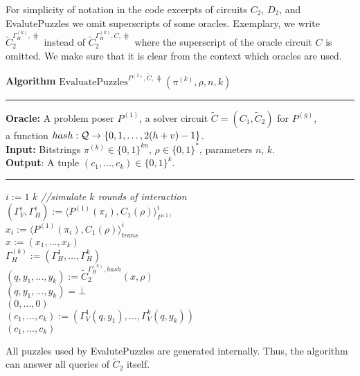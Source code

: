 For simplicity of notation in the code excerpts of circuits $C_2$, $D_2$, and EvalutePuzzles we
omit superscripts of some oracles. Exemplary, we write $\widetilde{C}_2^{\Gamma_H^{(k)}, \hash}$ instead of $\widetilde{C}_2^{\Gamma_H^{(k)}, C, \hash}$ where
the superscript of the oracle circuit $C$ is omitted. We make sure that it is clear from the context which oracles are used.

\begin{codeblock}
  \textbf{Algorithm} $\text{EvaluatePuzzles}^{P^{(1)}, \widetilde{C}, \hash}(\pi^{(k)}, \rho, n, k)$
  \medskip \hrule
  \textbf{Oracle:}  A problem poser $P^{(1)}$, a solver circuit $\widetilde{C} = (C_1, \widetilde{C}_2)$ for $P^{(g)}$,\\
  \IndII a function $hash : \mathcal{Q} \rightarrow \{0,1,\dots, 2(h+v)-1\}$.\\
  \textbf{Input:} Bitstrings $\pi^{(k)} \in \{0,1\}^{kn}$, $\rho \in \{0,1\}^{*}$, parameters $n$, $k$.\\
  \textbf{Output}: A tuple $(c_1, \dots, c_k) \in \{0,1\}^{k}$.
  \medskip\hrule
  \For $i:=1$ \To $k$ \Do \IndII \textit{//simulate $k$ rounds of interaction} \\
  \IndI $(\Gamma_V^{i}, \Gamma_H^{i}) := \langle P^{(1)}(\pi_i), C_1(\rho) \rangle_{P^{(1)}}^i$\\
  \IndI $x_i := \langle P^{(1)}(\pi_i), C_1(\rho) \rangle^i_{\mathit{trans}}$ \\
  $x := (x_1, \dots, x_k)$ \\
  $\Gamma_H^{(k)} := (\Gamma_H^1, \dotsc, \Gamma_H^k)$ \\
  $(q, y_1, \dots, y_k) := \widetilde{C}_2^{\Gamma_H^{(k)}, hash} (x, \rho)$ \\
  \If $(q, y_1, \dots, y_k) = \bot$ \Then \\
  \IndI \Return $(0, \dotsc, 0)$ \\
  $(c_1, \dotsc, c_k) := (\Gamma_V^{1}(q, y_1), \dotsc, \Gamma_V^{k}(q, y_k))$\\
  \Return $(c_1, \dotsc, c_k)$
\end{codeblock}
%
All puzzles used by EvalutePuzzles are generated internally. Thus, the algorithm can answer all queries of $\widetilde{C}_2$ itself.

